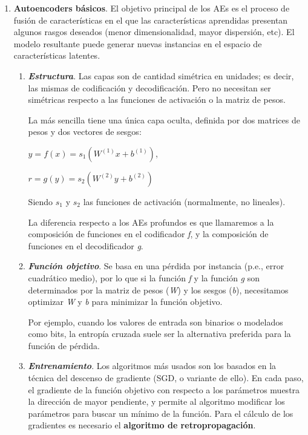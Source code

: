 \begin{enumerate}
    \begin{enumerate}
        \item \textbf{Autoencoders básicos}. El objetivo principal de los AEs es el proceso de fusión de características en el que las características aprendidas presentan algunos rasgos deseados (menor dimensionalidad, mayor dispersión, etc). El modelo resultante puede generar nuevas instancias en el espacio de características latentes.
        \begin{enumerate}
            \item \textit{\textbf{Estructura}}. Las capas son de cantidad simétrica en unidades; es decir, las mismas de codificación y decodificación. Pero no necesitan ser simétricas respecto a las funciones de activación o la matriz de pesos.
            
            La más sencilla tiene una única capa oculta, definida por dos matrices de pesos y dos vectores de sesgos:
            \begin{center}
                $y = f(x) = s_{1} (W^{(1)}x + b^{(1)})$,
                
                $r = g (y) = s_{2} (W^{(2)}y + b^{(2)} )$
            \end{center}
            
            Siendo $s_{1}$ y $s_{2}$ las funciones de activación (normalmente, no lineales).
            
            La diferencia respecto a los AEs profundos es que llamaremos a la composición de funciones en el codificador \textit{f}, y la composición de funciones en el decodificador \textit{g}.
            
            \item \textit{\textbf{Función objetivo}}. Se basa en una pérdida por instancia (p.e., error cuadrático medio), por lo que si la función \textit{f} y la función \textit{g} son determinados por la matriz de pesos (\textit{W}) y los sesgos (\textit{b}), necesitamos optimizar \textit{W} y \textit{b} para minimizar la función objetivo.
            
            Por ejemplo, cuando los valores de entrada son
            binarios o modelados como bits, la entropía cruzada suele ser la alternativa preferida
            para la función de pérdida.
            \newpage
        
            \item \textit{\textbf{Entrenamiento}}. Los algoritmos más usados son los basados en la técnica del descenso de gradiente (SGD, o variante de ello). En cada paso, el gradiente de la función objetivo con respecto a los parámetros muestra la dirección de mayor pendiente, y permite al algoritmo modificar los parámetros para buscar un mínimo de la función. Para el cálculo de los gradientes es necesario el \textbf{algoritmo de retropropagación}.
            

\end{enumerate}
\end{enumerate}
\end{enumerate}
